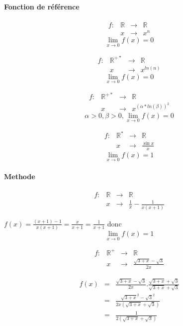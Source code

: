 \paragraph{Fonction de référence}
\begin{align*}
	f: &\mathbb{R} &\rightarrow &\mathbb{R} \\
	& x & \rightarrow &x^n 
\end{align*}
\[\lim_{x \to 0} f(x) = 0\]


\begin{align*}
	f: &\mathbb{R}^{+*} &\rightarrow &\mathbb{R} \\
	   & x & \rightarrow &x^{ln(n)} 
\end{align*}
\[\lim_{x \to 0} f(x) = 0\]

\begin{align*}
	f: &\mathbb{R}^{+*} &\rightarrow &\mathbb{R} \\
	   & x & \rightarrow &x^{(\alpha * ln(\beta))^2}
\end{align*}
\[\alpha >0, \beta>0, \lim_{x \to 0} f(x) = 0\]

\begin{align*}
	f: &\mathbb{R}^* &\rightarrow &\mathbb{R} \\
	   & x & \rightarrow &\frac{\sin{x}}{x}
\end{align*}
\[\lim_{x \to 0} f(x) = 1\]

\paragraph{Methode}
\begin{align*}
	f:&\mathbb{R} &\rightarrow &\mathbb{R}\\
	  &x& \rightarrow & \frac{1}{x} - \frac{1}{x(x+1)}
\end{align*}

$f(x) = \frac{(x+1)-1}{x(x+1)} = \frac{x}{x+1} = \frac{1}{x+1}$
donc \[\lim_{x \to 0}f(x) = 1\]

\begin{align*}
	f:&\mathbb{R}^+ &\rightarrow &\mathbb{R}\\
	  &x& \rightarrow & \frac{\sqrt{3+x} - \sqrt{3}}{2x}
\end{align*}

\begin{align*}
	f(x) &=& \frac{\sqrt{3+x} - \sqrt{3}}{2x} . \frac{\sqrt{3+x} + \sqrt{3}}{\sqrt{3+x} + \sqrt{3}} \\
			   &=& \frac{\sqrt{3+x}^2 - \sqrt{3}^2}{2x(\sqrt{3+x} + \sqrt{3})} \\
			   &=& \frac{1}{2(\sqrt{3+x}+\sqrt{3})}
\end{align*}

